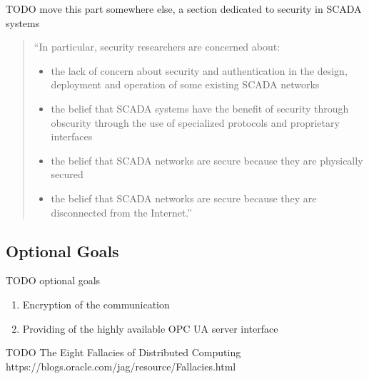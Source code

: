 TODO move this part somewhere else, a section dedicated to security in SCADA systems
\begin{quote}

``In particular, security researchers are concerned about:
	\begin{itemize}
		\item the lack of concern about security and authentication in the design, deployment and operation of some existing SCADA networks
		\item the belief that SCADA systems have the benefit of security through obscurity through the use of specialized protocols and proprietary interfaces
		\item the belief that SCADA networks are secure because they are physically secured
		\item the belief that SCADA networks are secure because they are disconnected from the Internet.''
	\end{itemize}
\end{quote}

\subsection*{Optional Goals}
TODO optional goals

\begin{enumerate}
	\item Encryption of the communication
	\item Providing of the highly available \gls{OPC} \gls{UA} server interface
\end{enumerate}


TODO The Eight Fallacies of Distributed Computing
https://blogs.oracle.com/jag/resource/Fallacies.html
